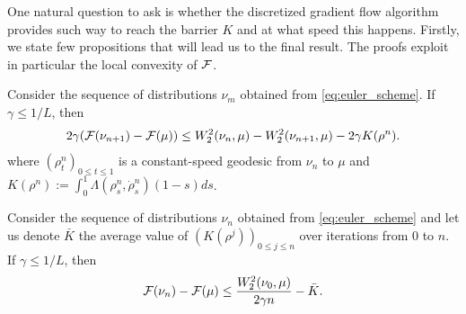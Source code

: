 One natural question to ask is whether the  discretized gradient flow algorithm provides such way to reach the barrier $K$ and at what speed this happens. %
Firstly, we state few propositions that will lead us to the final result. The proofs exploit in particular the local convexity of ${{\mathcal F}}$. 



\begin{proposition}\label{prop:evi}
	Consider the sequence of distributions $\nu_m$ obtained from \cref{eq:euler_scheme}. If $\gamma \leq 1/L$, then
	\begin{align}
2\gamma({{\mathcal F}}(\nu_{n+1})-{{\mathcal F}}(\mu))
\leq 
W_2^2(\nu_n,\mu)-W_2^2(\nu_{n+1},\mu)-2\gamma K(\rho^n).
\label{eq:evi}
\end{align}
where $(\rho^n_t)_{0\leq t \leq 1}$ is a constant-speed geodesic from $\nu_n$ to $\mu$ and $K(\rho^n):=\int_0^1 \Lambda(\rho^n_s,\dot{\rho}^n_s)(1-s)ds$.
\end{proposition}

\begin{theorem}\label{th:rates_mmd}
	Consider the sequence of distributions $\nu_n$ obtained from \cref{eq:euler_scheme} and let us denote $\bar{K}$ the average value of $(K(\rho^j))_{0\leq j \leq n}$ over iterations from $0$ to $n$.  If $\gamma \leq 1/L$, then
\begin{align}
{{\mathcal F}}(\nu_n)-{{\mathcal F}}(\mu)\leq  \frac{W_2^2(\nu_0,\mu)}{2 \gamma n} -\bar{K}.
\end{align}
\end{theorem}

